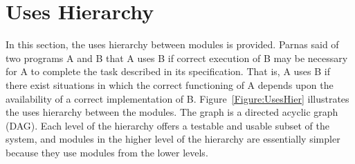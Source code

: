 \documentclass[12pt]{article}
\begin{document}
\section{Uses Hierarchy}
\label{Sec:UsesHier}
In this section, the uses hierarchy between modules is provided. Parnas said of two programs A and B that A uses B if correct execution of B may be necessary for A to complete the task described in its specification. That is, A uses B if there exist situations in which the correct functioning of A depends upon the availability of a correct implementation of B. Figure~\ref{Figure:UsesHier} illustrates the uses hierarchy between the modules. The graph is a directed acyclic graph (DAG). Each level of the hierarchy offers a testable and usable subset of the system, and modules in the higher level of the hierarchy are essentially simpler because they use modules from the lower levels.
\end{document}
